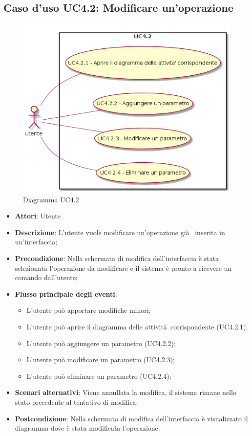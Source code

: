 \documentclass[../AnalisiDeiRequisiti.tex]{subfiles}
\begin{document}
			\subsection{Caso d'uso UC4.2: Modificare un'operazione}
			\begin{figure} [H]
				\centering
				\includegraphics[scale=0.45]{./Figures/UC4_2.png}
				\caption{Diagramma UC4.2}\label{}
			\end{figure}
			\begin{itemize}
				\item \textbf{Attori}: Utente
				\item \textbf{Descrizione}: L'utente vuole modificare un'operazione già  inserita in un'interfaccia;
				\item \textbf{Precondizione}: Nella schermata di modifica dell'interfaccia è stata selezionata l'operazione da modificare e il sistema è pronto a ricevere un comando dall'utente;
				\item \textbf{Flusso principale degli eventi}: \begin{itemize}
					\item L'utente può apportare modifiche minori;
					\item L'utente può aprire il diagramma delle attività corrispondente (UC4.2.1);
					\item L'utente può aggiungere un parametro (UC4.2.2);
					\item L'utente può modificare un parametro (UC4.2.3);
					\item L'utente può eliminare un parametro (UC4.2.4);
				\end{itemize}
				\item \textbf{Scenari alternativi}: Viene annullata la modifica, il sistema rimane nello stato precedente al tentativo di modifica;
				\item \textbf{Postcondizione}: Nella schermata di modifica dell'interfaccia è visualizzato il diagramma dove è stata modificata l'operazione.
			\end{itemize}
\end{document}
